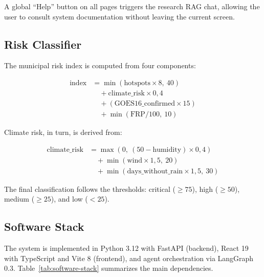 \documentclass[preprint,12pt,times,numbers]{elsarticle}
\begin{document}
A global ``Help'' button on all pages triggers the research RAG chat, allowing the user to consult system documentation without leaving the current screen.

\subsection{Risk Classifier}
\label{sec:risk}

The municipal risk index is computed from four components:

\begin{align}
\text{index} &= \min(\text{hotspots} \times 8,\ 40) \nonumber \\
               &\quad + \text{climate\_risk} \times 0{,}4 \nonumber \\
               &\quad + (\text{GOES16\_confirmed} \times 15) \nonumber \\
               &\quad + \min(\text{FRP} / 100,\ 10)
\end{align}

Climate risk, in turn, is derived from:

\begin{align}
\text{climate\_risk} &= \max(0,\ (50 - \text{humidity}) \times 0{,}4) \nonumber \\
                         &\quad + \min(\text{wind} \times 1{,}5,\ 20) \nonumber \\
                         &\quad + \min(\text{days\_without\_rain} \times 1{,}5,\ 30)
\end{align}

The final classification follows the thresholds: critical ($\ge 75$), high ($\ge 50$), medium ($\ge 25$), and low ($< 25$).

\subsection{Software Stack}
\label{sec:software-stack}

The system is implemented in Python 3.12 with FastAPI (backend), React 19 with TypeScript and Vite 8 (frontend), and agent orchestration via LangGraph 0.3. Table~\ref{tab:software-stack} summarizes the main dependencies.
\end{document}
